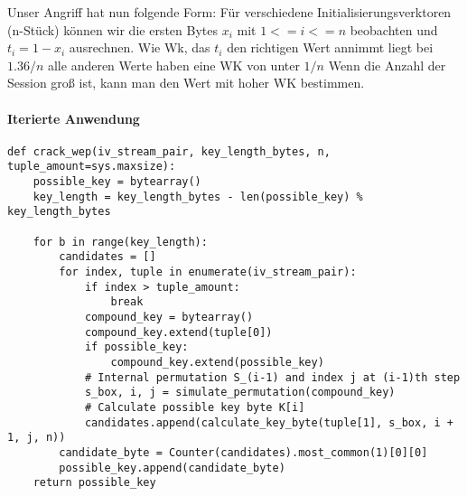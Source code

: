 \documentclass[10pt,a4paper]{article}
\begin{document}
Unser Angriff hat nun folgende Form: Für verschiedene Initialisierungsverktoren (n-Stück) können wir die ersten Bytes $x_i$ mit $1 <= i <= n$ beobachten und $t_i = 1 - x_i$ ausrechnen. Wie Wk, das $t_i$ den richtigen Wert annimmt liegt bei $1.36/n$ alle anderen Werte haben eine WK von unter $1/n$ Wenn die Anzahl der Session groß ist, kann man den Wert mit hoher WK bestimmen.
\paragraph{Iterierte Anwendung} 
\begin{lstlisting}
def crack_wep(iv_stream_pair, key_length_bytes, n, tuple_amount=sys.maxsize):
    possible_key = bytearray()
    key_length = key_length_bytes - len(possible_key) % key_length_bytes

    for b in range(key_length):
        candidates = []
        for index, tuple in enumerate(iv_stream_pair):
            if index > tuple_amount:
                break
            compound_key = bytearray()
            compound_key.extend(tuple[0])
            if possible_key:
                compound_key.extend(possible_key)
            # Internal permutation S_(i-1) and index j at (i-1)th step
            s_box, i, j = simulate_permutation(compound_key)
            # Calculate possible key byte K[i]
            candidates.append(calculate_key_byte(tuple[1], s_box, i + 1, j, n))
        candidate_byte = Counter(candidates).most_common(1)[0][0]
        possible_key.append(candidate_byte)
    return possible_key
\end{lstlisting}
\end{document}
